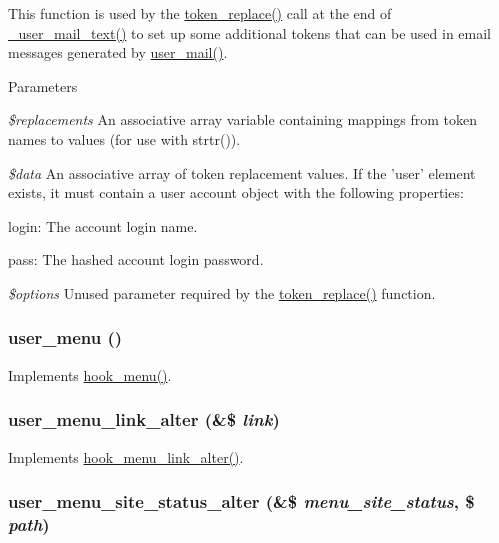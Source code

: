 This function is used by the \hyperlink{includes_2token_8inc_a47eb294b05ca8d04439a9a82ccc4d82a}{token\_\-replace()} call at the end of \hyperlink{user_8module_afeb35780400f149e307cd4b4f1d358a1}{\_\-user\_\-mail\_\-text()} to set up some additional tokens that can be used in email messages generated by \hyperlink{user_8module_a1398b4fdee5dad70d6da89ce5be6c43d}{user\_\-mail()}.


\begin{DoxyParams}{Parameters}
\item[{\em \$replacements}]An associative array variable containing mappings from token names to values (for use with strtr()). \item[{\em \$data}]An associative array of token replacement values. If the 'user' element exists, it must contain a user account object with the following properties:
\begin{DoxyItemize}
\item login: The account login name.
\item pass: The hashed account login password. 
\end{DoxyItemize}\item[{\em \$options}]Unused parameter required by the \hyperlink{includes_2token_8inc_a47eb294b05ca8d04439a9a82ccc4d82a}{token\_\-replace()} function. \end{DoxyParams}
\hypertarget{user_8module_a48f90f1bf0f523df93ab31bd5b200573}{
\subsubsection[{user\_\-menu}]{\setlength{\rightskip}{0pt plus 5cm}user\_\-menu ()}}
\label{user_8module_a48f90f1bf0f523df93ab31bd5b200573}
Implements \hyperlink{group__hooks_ga5c95244fea59b25666e409759e133ded}{hook\_\-menu()}. \hypertarget{user_8module_a2d32cfeed1c6c5f774ccd27c3e51308e}{
\subsubsection[{user\_\-menu\_\-link\_\-alter}]{\setlength{\rightskip}{0pt plus 5cm}user\_\-menu\_\-link\_\-alter (\&\$ {\em link})}}
\label{user_8module_a2d32cfeed1c6c5f774ccd27c3e51308e}
Implements \hyperlink{group__hooks_ga53f6d87f599e7f585ca84a7e0874df81}{hook\_\-menu\_\-link\_\-alter()}. \hypertarget{user_8module_ac2ced46ecfe66b365084a2b70acf2247}{
\subsubsection[{user\_\-menu\_\-site\_\-status\_\-alter}]{\setlength{\rightskip}{0pt plus 5cm}user\_\-menu\_\-site\_\-status\_\-alter (\&\$ {\em menu\_\-site\_\-status}, \/  \$ {\em path})}}
